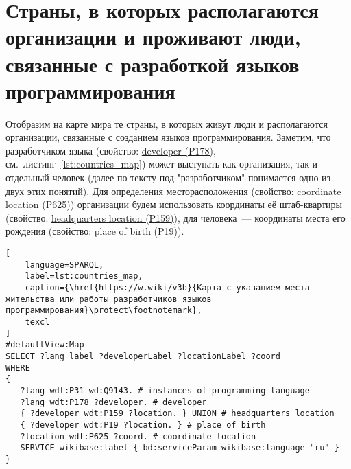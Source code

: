 \section{Страны, в которых располагаются организации и проживают люди, связанные с разработкой языков программирования}

Отобразим на карте мира те страны, в которых живут люди и располагаются организации, связанные с созданием языков программирования. Заметим, что разработчиком языка (свойство: \href{https://www.wikidata.org/wiki/Property:P178}{developer (P178)}, см.~листинг~\ref{lst:countries_map}) может выступать как организация, так и отдельный человек (далее по тексту под "разработчиком" понимается одно из двух этих понятий). Для определения месторасположения (свойство: \href{https://www.wikidata.org/wiki/Property:P625}{coordinate location (P625)}) организации будем использовать координаты её штаб-квартиры (свойство: \href{https://www.wikidata.org/wiki/Property:P159}{headquarters location (P159)}), для человека~--- координаты места его рождения (свойство: \href{https://www.wikidata.org/wiki/Property:P19}{place of birth (P19)}).

\begin{lstlisting}[
	language=SPARQL,
	label=lst:countries_map,
	caption={\href{https://w.wiki/v3b}{Карта с указанием места жительства или работы разработчиков языков программирования}\protect\footnotemark},
	texcl
]
#defaultView:Map
SELECT ?lang_label ?developerLabel ?locationLabel ?coord
WHERE
{
   ?lang wdt:P31 wd:Q9143. # instances of programming language
   ?lang wdt:P178 ?developer. # developer
   { ?developer wdt:P159 ?location. } UNION # headquarters location
   { ?developer wdt:P19 ?location. } # place of birth
   ?location wdt:P625 ?coord. # coordinate location
   SERVICE wikibase:label { bd:serviceParam wikibase:language "ru" } 	
}
\end{lstlisting}

